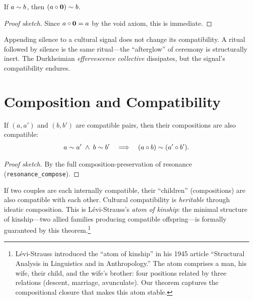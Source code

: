 \begin{theorem}
\label{thm:absorbed-void}
If $a \sim b$, then $(a \circ \mathbf{0}) \sim b$.
\end{theorem}

\begin{proof}[Proof sketch]
Since $a \circ \mathbf{0} = a$ by the void axiom, this is immediate.
\end{proof}

Appending silence to a cultural signal does not change its compatibility.
A ritual followed by silence is the same ritual---the ``afterglow'' of
ceremony is structurally inert.  The Durkheimian \emph{effervescence
collective} dissipates, but the signal's compatibility endures.

\section{Composition and Compatibility}
\label{sec:ch12-comp}

\begin{theorem}
\label{thm:comp-preserves}
If $(a, a')$ and $(b, b')$ are compatible pairs, then their compositions
are also compatible:
\[
  a \sim a' \;\wedge\; b \sim b'
  \quad\Longrightarrow\quad
  (a \circ b) \sim (a' \circ b').
\]
\end{theorem}

\begin{proof}[Proof sketch]
By the full composition-preservation of resonance
(\texttt{resonance\_compose}).
\end{proof}

If two couples are each internally compatible, their ``children'' (compositions)
are also compatible with each other.  Cultural compatibility is
\emph{heritable} through ideatic composition.  This is Lévi-Strauss's
\emph{atom of kinship}: the minimal structure of kinship---two
allied families producing compatible offspring---is formally guaranteed by
this theorem.\footnote{Lévi-Strauss introduced the ``atom of kinship'' in
his 1945 article ``Structural Analysis in Linguistics and in Anthropology.''
The atom comprises a man, his wife, their child, and the wife's brother: four
positions related by three relations (descent, marriage, avunculate).  Our
theorem captures the compositional closure that makes this atom stable.}

